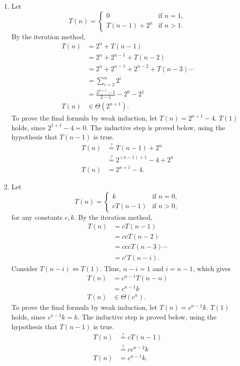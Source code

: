 \documentclass[12pt]{article}
\newcommand{\posseq}{\stackrel{?}{=}}
\begin{document}
\begin{enumerate}
\begin{enumerate}
    \item Let \[
      T(n) = 
      \begin{cases}
        0                & \text{if } n = 1, \\
        T(n - 1) + 2^{n} & \text{if } n > 1.
      \end{cases}
    \] 
    By the iteration method,
    \begin{align*}
      T(n) & = 2^{n} + T(n - 1)                                \\
           & = 2^{n} + 2^{n - 1} + T(n - 2)                    \\
           & = 2^{n} + 2^{n - 1} + 2^{n - 2} + T(n - 3) \cdots \\
           & = \sum_{i = 2}^{n} 2^{i}                          \\
           & = \tfrac{2^{n + 1} - 1}{2 - 1} - 2^{0} - 2^{1}    \\
      T(n) & \in \Theta(2^{n + 1}).
    \end{align*}
    To prove the final formula by weak induction, let $T(n) = 2^{n + 1} - 4$. $T(1)$ holds, since $2^{1 + 1} - 4 = 0$. The inductive step is proved below, using the hypothesis that $T(n - 1)$ is true.
    \begin{align*}
      T(n) & \posseq T(n - 1) + 2^{n}            \\
           & \posseq 2^{(n - 1) + 1} - 4 + 2^{n} \\
      T(n) & = 2^{n + 1} - 4.
    \end{align*}
    
    \item\label{ex:4c} Let \[
      T(n) = 
      \begin{cases}
        k         & \text{if } n = 0, \\
        cT(n - 1) & \text{if } n > 0,
      \end{cases}
    \] 
    for any constants $c, k$. By the iteration method,
    \begin{align*}
      T(n) & = cT(n - 1)          \\
           & = ccT(n - 2)         \\
           & = cccT(n - 3) \cdots \\
           & = c^{i} T(n - i).
    \end{align*}
    Consider $T(n - i) \Leftrightarrow T(1)$. Thus, $n - i = 1$ and $i = n - 1$, which gives
    \begin{align*}
      T(n) & = c^{n - 1} T(n - n) \\
           & = c^{n - 1} k        \\
      T(n) & \in \Theta(c^{n}).
    \end{align*}
    To prove the final formula by weak induction, let $T(n) = c^{n - 1} k$. $T(1)$ holds, since $c^{1 - 1} k = k$. The inductive step is proved below, using the hypothesis that $T(n - 1)$ is true.
    \begin{align*}
      T(n) & \posseq cT(n - 1)     \\
           & \posseq c c^{n - 2} k \\
      T(n) & = c^{n - 1} k.
    \end{align*}
    

\end{enumerate}
\end{enumerate}
\end{document}
